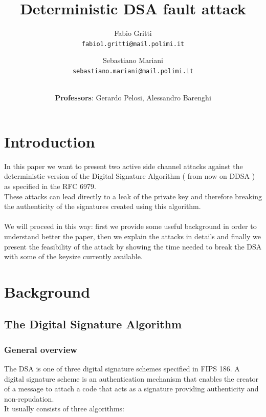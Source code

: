 \documentclass[11pt,english]{article}
\begin{document}
\title{\Huge{\textbf{Deterministic DSA fault attack}}}
\author{
  Fabio Gritti\\
  \texttt{fabio1.gritti@mail.polimi.it}
  \and
  Sebastiano Mariani\\
  \texttt{sebastiano.mariani@mail.polimi.it}
  \and \\
  \textbf{Professors}: Gerardo Pelosi, Alessandro Barenghi
}
\date{}
\maketitle

\pagestyle{plain}
\tableofcontents

\section{Introduction}
In this paper we want to present two active side channel attacks against the deterministic version of the Digital Signature Algorithm ( from now on DDSA ) as specified in the RFC 6979\cite{rfc}.\\
These attacks can lead directly to a leak of the private key and therefore breaking the authenticity of the signatures created using this algorithm. \\\\
We will proceed in this way: first we provide some useful background in order to understand better the paper, then we explain the attacks in details and finally we present the feasibility of the attack by showing the time needed to break the DSA with some of the keysize currently available.

\section{Background}

\subsection{The Digital Signature Algorithm}

\subsubsection{General overview}
The DSA is one of three digital signature schemes specified in FIPS 186\cite{fips}. A digital signature scheme is an authentication mechanism that enables the creator of a message to attach a code that acts as a signature providing authenticity and non-repudation. \\It usually consists of three algorithms:
\end{document}
